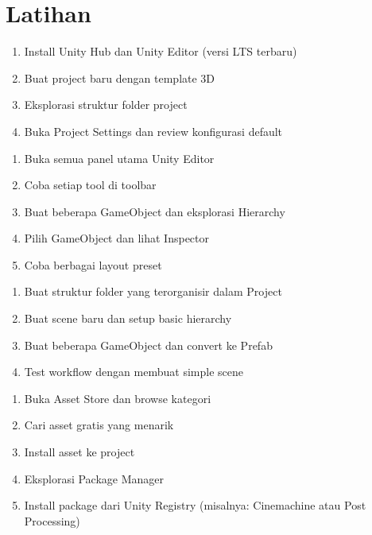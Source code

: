 \section{Latihan}

\begin{latihan}
\begin{enumerate}
\item Install Unity Hub dan Unity Editor (versi LTS terbaru)
\item Buat project baru dengan template 3D
\item Eksplorasi struktur folder project
\item Buka Project Settings dan review konfigurasi default
\end{enumerate}
\end{latihan}

\begin{latihan}
\begin{enumerate}
\item Buka semua panel utama Unity Editor
\item Coba setiap tool di toolbar
\item Buat beberapa GameObject dan eksplorasi Hierarchy
\item Pilih GameObject dan lihat Inspector
\item Coba berbagai layout preset
\end{enumerate}
\end{latihan}

\begin{latihan}
\begin{enumerate}
\item Buat struktur folder yang terorganisir dalam Project
\item Buat scene baru dan setup basic hierarchy
\item Buat beberapa GameObject dan convert ke Prefab
\item Test workflow dengan membuat simple scene
\end{enumerate}
\end{latihan}

\begin{latihan}
\begin{enumerate}
\item Buka Asset Store dan browse kategori
\item Cari asset gratis yang menarik
\item Install asset ke project
\item Eksplorasi Package Manager
\item Install package dari Unity Registry (misalnya: Cinemachine atau Post Processing)
\end{enumerate}
\end{latihan}
